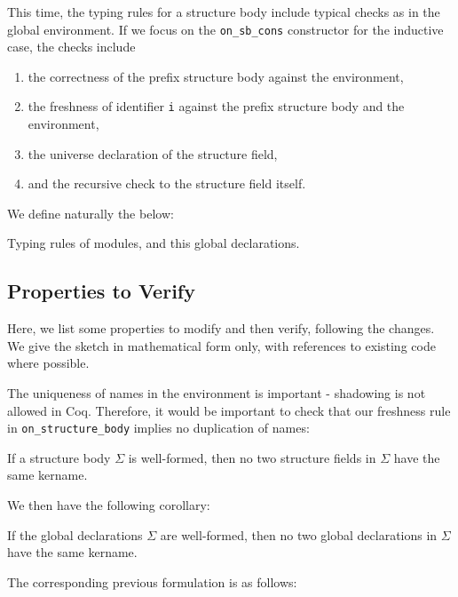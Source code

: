 This time, the typing rules for a structure body include typical checks as in
the global environment. If we focus on the \verb|on_sb_cons| constructor for the
inductive case, the checks include
\begin{enumerate}
  \item the correctness of the prefix structure body against the environment,
  \item the freshness of identifier \verb|i| against the prefix structure body
  and the environment,
  \item the universe declaration of the structure field,
  \item and the recursive check to the structure field itself.
\end{enumerate} 

We define naturally the below:

\begin{listing}[H]
  \caption{Typing rules of modules, and this global declarations.}
  \label{lst:2-typing-mod}
\end{listing}

\subsection*{Properties to Verify}

Here, we list some properties to modify and then verify, following the changes.
We give the sketch in mathematical form only, with references to existing code
where possible.

The uniqueness of names in the environment is important - shadowing is not
allowed in Coq. Therefore, it would be important to check that our freshness
rule in \verb|on_structure_body| implies no duplication of names:

\begin{lemma}
  If a structure body $\Sigma$ is well-formed, then no two structure fields in
  $\Sigma$ have the same kername.
\end{lemma}

We then have the following corollary:

\begin{corollary}
  If the global declarations $\Sigma$ are well-formed, then no two global
  declarations in $\Sigma$ have the same kername.
\end{corollary}

The corresponding previous formulation is as follows:

